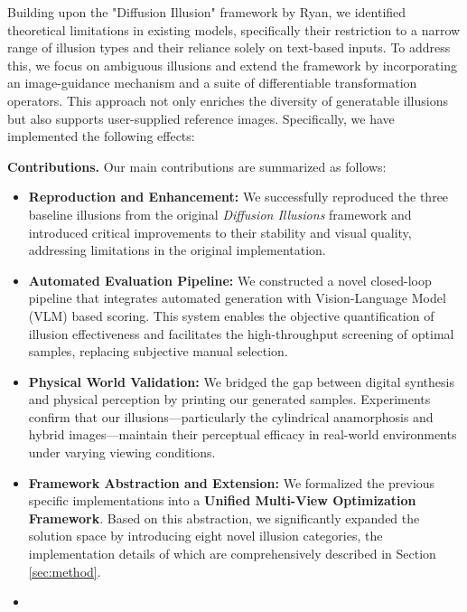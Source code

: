 \documentclass{article}
\begin{document}
Building upon the "Diffusion Illusion" framework by Ryan\cite{10.1145/3641519.3657500}, we identified theoretical limitations in existing models, specifically their restriction to a narrow range of illusion types and their reliance solely on text-based inputs. To address this, we focus on ambiguous illusions and extend the framework by incorporating an image-guidance mechanism and a suite of differentiable transformation operators. This approach not only enriches the diversity of generatable illusions but also supports user-supplied reference images. Specifically, we have implemented the following effects:

\textbf{Contributions.} Our main contributions are summarized as follows:

\begin{itemize}
    \item \textbf{Reproduction and Enhancement:} We successfully reproduced the three baseline illusions from the original \emph{Diffusion Illusions} framework and introduced critical improvements to their stability and visual quality, addressing limitations in the original implementation.
    
    \item \textbf{Automated Evaluation Pipeline:} We constructed a novel closed-loop pipeline that integrates automated generation with Vision-Language Model (VLM) based scoring. This system enables the objective quantification of illusion effectiveness and facilitates the high-throughput screening of optimal samples, replacing subjective manual selection.
    
    \item \textbf{Physical World Validation:} We bridged the gap between digital synthesis and physical perception by printing our generated samples. Experiments confirm that our illusions—particularly the cylindrical anamorphosis and hybrid images—maintain their perceptual efficacy in real-world environments under varying viewing conditions.
    
    \item \textbf{Framework Abstraction and Extension:} We formalized the previous specific implementations into a \textbf{Unified Multi-View Optimization Framework}. Based on this abstraction, we significantly expanded the solution space by introducing eight novel illusion categories, the implementation details of which are comprehensively described in Section \ref{sec:method}.

    \item  \textbf{}
\end{itemize}
\end{document}
